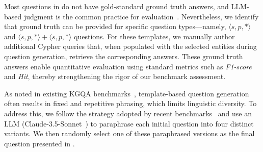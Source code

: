  Most questions in \benchmarkname{} do not have gold-standard ground truth answers, and LLM-based judgment is the common practice for evaluation~\cite{ms_graphrag, fast_graphrag}. Nevertheless, we identify that ground truth can be provided for specific question types—namely, $\langle s, p, * \rangle$ and $\langle s, p, * \rangle + \langle s, p, * \rangle$ questions. For these templates, we manually author additional Cypher queries that, when populated with the selected entities during question generation, retrieve the corresponding answers. These ground truth answers enable quantitative evaluation using standard metrics such as \textit{F1-score} and \textit{Hit}, thereby strengthening the rigor of our benchmark assessment.

 As noted in existing KGQA benchmarks~\cite{cwq, graphq, grailqa, graphcot, cypherbench}, template-based question generation often results in fixed and repetitive phrasing, which limits linguistic diversity. To address this, we follow the strategy adopted by recent benchmarks~\cite{graphcot, cypherbench} and use an LLM (Claude-3.5-Sonnet~\cite{claude}) to paraphrase each initial question into four distinct variants. We then randomly select one of these paraphrased versions as the final question presented in \benchmarkname{}.

